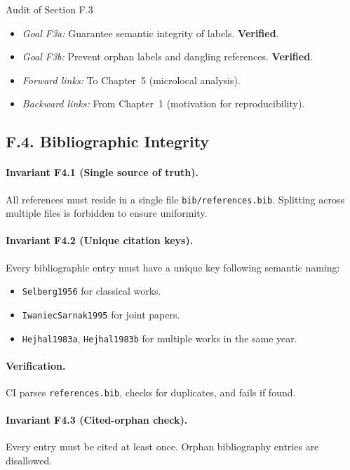 \begin{auditblock}{Audit of Section F.3}
\leavevmode
\begin{itemize}
  \item \emph{Goal F3a:} Guarantee semantic integrity of labels.
        \textbf{Verified}.
  \item \emph{Goal F3b:} Prevent orphan labels and dangling references.
        \textbf{Verified}.
  \item \emph{Forward links:} To Chapter~5 (microlocal analysis).
  \item \emph{Backward links:} From Chapter~1 (motivation for
        reproducibility).
\end{itemize}
\end{auditblock}

\subsection*{F.4. Bibliographic Integrity}

\paragraph{Invariant F4.1 (Single source of truth).}
All references must reside in a single file
\texttt{bib/references.bib}. Splitting across multiple files is
forbidden to ensure uniformity.

\paragraph{Invariant F4.2 (Unique citation keys).}
Every bibliographic entry must have a unique key following semantic
naming:
\begin{itemize}
  \item \texttt{Selberg1956} for classical works.
  \item \texttt{IwaniecSarnak1995} for joint papers.
  \item \texttt{Hejhal1983a}, \texttt{Hejhal1983b} for multiple works
        in the same year.
\end{itemize}

\paragraph{Verification.}
CI parses \texttt{references.bib}, checks for duplicates, and fails if
found.

\paragraph{Invariant F4.3 (Cited-orphan check).}
Every entry must be cited at least once. Orphan bibliography entries
are disallowed.

